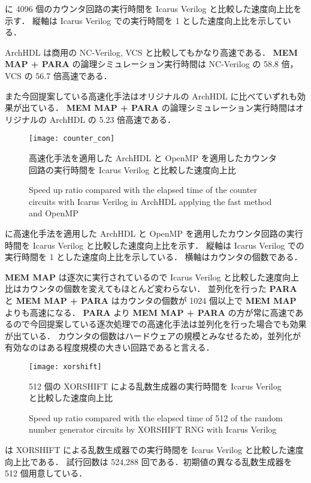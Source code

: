  に 4096 個のカウンタ回路の実行時間を Icarus Verilog と比較した速度向上比を示す．
縦軸は Icarus Verilog での実行時間を 1 とした速度向上比を示している．

ArchHDL は商用の NC-Verilog, VCS と比較してもかなり高速である．
\textbf{MEM MAP + PARA} の論理シミュレーション実行時間は NC-Verilog の 58.8 倍，VCS の 56.7 倍高速である．

また今回提案している高速化手法はオリジナルの ArchHDL に比べていずれも効果が出ている．
\textbf{MEM MAP + PARA} の論理シミュレーション実行時間はオリジナルの ArchHDL の 5.23 倍高速である．



\begin{figure}[tb]
 \centering
 \texttt{[image: counter\_con]}
 \caption{高速化手法を適用した ArchHDL と OpenMP を適用したカウンタ回路の実行時間を Icarus Verilog と比較した速度向上比}
\fi
 \caption{Speed up ratio compared with the elapsed time of the counter circuits with Icarus Verilog in ArchHDL applying the fast method and OpenMP}
 \label{fig:counter_con}
\end{figure}

 に高速化手法を適用した ArchHDL と OpenMP を適用したカウンタ回路の実行時間を Icarus Verilog と比較した速度向上比を示す．
縦軸は Icarus Verilog での実行時間を 1 とした速度向上比を示している．
横軸はカウンタの個数である．

\textbf{MEM MAP} は逐次に実行されているので Icarus Verilog と比較した速度向上比はカウンタの個数を変えてもほとんど変わらない．
並列化を行った \textbf{PARA} と \textbf{MEM MAP + PARA} はカウンタの個数が 1024 個以上で \textbf{MEM MAP} よりも高速になる．
\textbf{PARA} より \textbf{MEM MAP + PARA} の方が常に高速であるので今回提案している逐次処理での高速化手法は並列化を行った場合でも効果が出ている．
カウンタの個数はハードウェアの規模とみなせるため，並列化が有効なのはある程度規模の大きい回路であると言える．


\begin{figure}[tb]
 \centering
 \texttt{[image: xorshift]}
 \caption{512 個の XORSHIFT による乱数生成器の実行時間を Icarus Verilog と比較した速度向上比}
\fi
 \caption{Speed up ratio compared with the elapsed time of 512 of the random number generator circuits by XORSHIFT RNG with Icarus Verilog}
 \label{fig:xorshift}
\end{figure}

 は XORSHIFT による乱数生成器での実行時間を Icarus Verilog と比較した速度向上比である．
試行回数は 524,288 回である．初期値の異なる乱数生成器を 512 個用意している．

